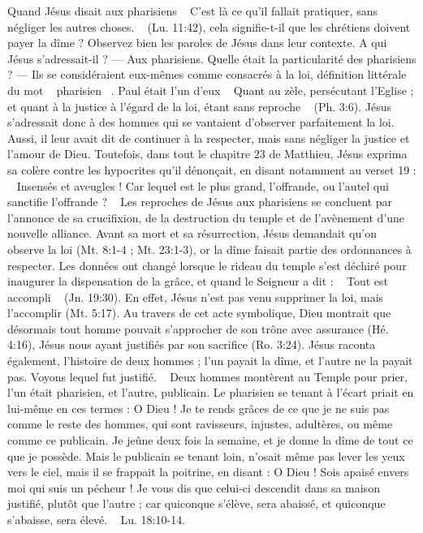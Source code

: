 \begin{multicols}{2}
{Quand Jésus disait aux pharisiens ~ C’est là ce qu’il fallait pratiquer, sans négliger les autres choses. ~ (Lu. 11:42), cela signifie-t-il que les chrétiens doivent payer la dîme ? 
Observez bien les paroles de Jésus dans leur contexte. 
A qui Jésus s’adressait-il ? — Aux pharisiens. Quelle était la particularité des pharisiens ? — Ils se considéraient eux-mêmes comme consacrés à la loi, définition littérale du mot ~ pharisien ~. Paul était l'un d'eux ~ Quant au zèle, persécutant l'Eglise ; et quant à la justice à l’égard de la loi, étant sans reproche ~ (Ph. 3:6). Jésus s’adressait donc à des hommes qui se vantaient d’observer parfaitement la loi. Aussi, il leur avait dit de continuer à la respecter, mais sans négliger la justice et l’amour de Dieu. Toutefois, dans tout le chapitre 23 de Matthieu, Jésus exprima sa colère contre les hypocrites qu’il dénonçait, en disant notamment au verset 19 : ~ Insensés et aveugles ! Car lequel est le plus grand, l’offrande, ou l'autel qui sanctifie l’offrande ? ~ Les reproches de Jésus aux pharisiens se concluent par l’annonce de sa crucifixion, de la destruction du temple et de l’avènement d’une nouvelle alliance. Avant sa mort et sa résurrection, Jésus demandait qu’on observe la loi (Mt. 8:1-4 ; Mt. 23:1-3), or la dîme faisait partie des ordonnances à respecter. Les données ont changé lorsque le rideau du temple s'est déchiré pour inaugurer la dispensation de la grâce, et quand le Seigneur a dit : ~ Tout est accompli ~ (Jn. 19:30). En effet, Jésus n'est pas venu supprimer la loi, mais l'accomplir (Mt. 5:17). Au travers de cet acte symbolique, Dieu montrait que désormais tout homme pouvait s'approcher de son trône avec assurance (Hé. 4:16), Jésus nous ayant justifiés par son sacrifice (Ro. 3:24). Jésus raconta également, l’histoire de deux hommes ; l’un payait la dîme, et l’autre ne la payait pas. Voyons lequel fut justifié. ~ Deux hommes montèrent au Temple pour prier, l'un était pharisien, et l'autre, publicain. Le pharisien se tenant à l'écart priait en lui-même en ces termes : O Dieu ! Je te rends grâces de ce que je ne suis pas comme le reste des hommes, qui sont ravisseurs, injustes, adultères, ou même comme ce publicain. Je jeûne deux fois la semaine, et je donne la dîme de tout ce que je possède. Mais le publicain se tenant loin, n'osait même pas lever les yeux vers le ciel, mais il se frappait la poitrine, en disant : O Dieu ! Sois apaisé envers moi qui suis un pécheur ! Je vous dis que celui-ci descendit dans sa maison justifié, plutôt que l'autre ; car quiconque s'élève, sera abaissé, et quiconque s'abaisse, sera élevé. ~ Lu. 18:10-14.
}
\end{multicols}
